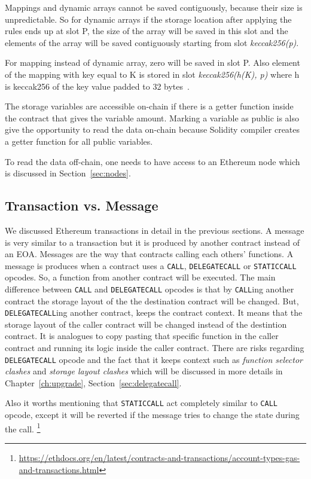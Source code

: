 Mappings and dynamic arrays cannot be saved contiguously, because their size is unpredictable. So for dynamic arrays if the storage location after applying the rules ends up at slot P, the size of the array will be saved in this slot and the elements of the array will be saved contiguously starting from slot \textit{keccak256(p)}.

For mapping instead of dynamic array, zero will be saved in slot P. Also element of the mapping with key equal to K is stored in slot \textit{keccak256(h(K), p)} where h is keccak256 of the key value padded to 32 bytes~\cite{wood2014ethereum}.

The storage variables are accessible on-chain if there is a getter function inside the contract that gives the variable amount. Marking a variable as public is also give the opportunity to read the data on-chain because Solidity compiler creates a getter function for all public variables. 

To read the data off-chain, one needs to have access to an Ethereum node which is discussed in Section~\ref{sec:nodes}.


\subsection{Transaction vs. Message}\label{sec:txVsMsg}
We discussed Ethereum transactions in detail in the previous sections. A message is very similar to a transaction but it is produced by another contract instead of an EOA. Messages are the way that contracts calling each others' functions. A message is produces when a contract uses a \texttt{CALL}, \texttt{DELEGATECALL} or \texttt{STATICCALL} opcodes. So, a function from another contract will be executed. The main difference between \texttt{CALL} and \texttt{DELEGATECALL} opcodes is that by \texttt{CALL}ing another contract the storage layout of the the destination contract will be changed. But, \texttt{DELEGATECALL}ing another contract, keeps the contract context. It means that the storage layout of the caller contract will be changed instead of the destintion contract. It is analogues to copy pasting that specific function in the caller contract and running its logic inside the caller contract. There are risks regarding \texttt{DELEGATECALL} opcode and the fact that it keeps context such as \textit{function selector clashes} and \textit{storage layout clashes} which will be discussed in more details in Chapter~\ref{ch:upgrade}, Section~\ref{sec:delegatecall}.

Also it worths mentioning that \texttt{STATICCALL} act completely similar to \texttt{CALL} opcode, except it will be reverted if the message tries to change the state during the call. 
\footnote{\url{https://ethdocs.org/en/latest/contracts-and-transactions/account-types-gas-and-transactions.html}}


